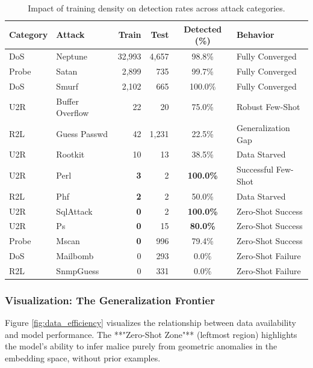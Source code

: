 \documentclass[
  10pt,
  twocolumn,
  a4paper,
  parskip=half
]{scrartcl}
\begin{document}
   \begin{table}[t]
    \centering
    \scriptsize
    \renewcommand{\arraystretch}{1.15}
    \begin{tabular}{ll|rr|c|l}
        \toprule
        \textbf{Category} & \textbf{Attack} & \textbf{Train} & \textbf{Test} & \textbf{Detected (\%)} & \textbf{Behavior} \\
        \midrule
        \rowcolor{green!10} DoS & Neptune & 32,993 & 4,657 & 98.8\% & Fully Converged \\
        \rowcolor{green!10} Probe & Satan & 2,899 & 735 & 99.7\% & Fully Converged \\
        \rowcolor{green!10} DoS & Smurf & 2,102 & 665 & 100.0\% & Fully Converged \\
        \midrule
        \rowcolor{yellow!10} U2R & Buffer Overflow & 22 & 20 & 75.0\% & Robust Few-Shot \\
        \rowcolor{yellow!10} R2L & Guess Passwd & 42 & 1,231 & 22.5\% & Generalization Gap \\
        \rowcolor{yellow!10} U2R & Rootkit & 10 & 13 & 38.5\% & Data Starved \\
        \rowcolor{orange!10} U2R & Perl & \textbf{3} & 2 & \textbf{100.0\%} & Successful Few-Shot \\
        \rowcolor{orange!10} R2L & Phf & \textbf{2} & 2 & 50.0\% & Data Starved \\
        \midrule
        \rowcolor{blue!10} U2R & SqlAttack & \textbf{0} & 2 & \textbf{100.0\%} & Zero-Shot Success \\
        \rowcolor{blue!10} U2R & Ps & \textbf{0} & 15 & \textbf{80.0\%} & Zero-Shot Success \\
        \rowcolor{blue!10} Probe & Mscan & \textbf{0} & 996 & 79.4\% & Zero-Shot Success \\
        \rowcolor{red!10} DoS & Mailbomb & 0 & 293 & 0.0\% & Zero-Shot Failure \\
        \rowcolor{red!10} R2L & SnmpGuess & 0 & 331 & 0.0\% & Zero-Shot Failure \\
        \bottomrule
    \end{tabular}
    \caption{Impact of training density on detection rates across attack categories.}
    \label{tab:train_vs_test}
\end{table}


    \subsubsection{Visualization: The Generalization Frontier}
    Figure \ref{fig:data_efficiency} visualizes the relationship between data availability and model performance. The **"Zero-Shot Zone"** (leftmost region) highlights the model's ability to infer malice purely from geometric anomalies in the embedding space, without prior examples.
\end{document}
